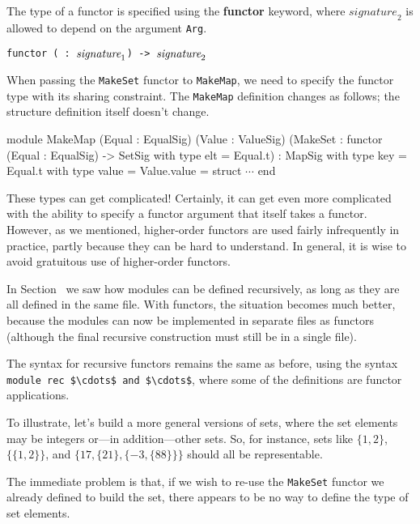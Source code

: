 \label{keyword:functor}
The type of a functor is specified using the \textbf{functor} keyword,
where \ensuremath{{\mathit{signature}}_{2}} is allowed to depend on
the argument \hbox{\lstinline/Arg/}.

\begin{center}
\texttt{functor ( : $\textit{signature}_1$) -> $\textit{signature}_2$}
\end{center}
%
When passing the \hbox{\lstinline/MakeSet/} functor to \hbox{\lstinline/MakeMap/}, we need to
specify the functor type with its sharing constraint. The
\hbox{\lstinline/MakeMap/} definition changes as follows; the structure definition
itself doesn't change.

\begin{ocaml}
module MakeMap (Equal : EqualSig) (Value : ValueSig)
   (MakeSet : functor (Equal : EqualSig) ->
      SetSig with type elt = Equal.t)
 : MapSig
   with type key = Equal.t
   with type value = Value.value
= struct $\cdots$ end
\end{ocaml}
%
These types can get complicated!  Certainly, it can get even more
complicated with the ability to specify a functor argument that itself
takes a functor. However, as we mentioned, higher-order functors are
used fairly infrequently in practice, partly because they can be hard
to understand.  In general, it is wise to avoid gratuitous use of
higher-order functors.


In Section~ we saw how modules can
be defined recursively, as long as they are all defined in the same
file.  With functors, the situation becomes much better, because the
modules can now be implemented in separate files as functors (although
the final recursive construction must still be in a single file).

The syntax for recursive functors remains the same as before, using
the syntax \hbox{\lstinline/module rec $\cdots$ and $\cdots$/}, where
some of the definitions are functor applications.

To illustrate, let's build a more general versions of sets, where the
set elements may be integers or---in addition---other sets.  So, for
instance, sets like $\{ 1, 2 \}$, $\{ \{ 1, 2 \} \}$, and $\{ 17, \{
21 \}, \{ -3, \{ 88 \} \} \}$ should all be representable.

The immediate problem is that, if we wish to re-use
the \hbox{\lstinline$MakeSet$} functor we already defined to build the
set, there appears to be no way to define the type of set elements.

